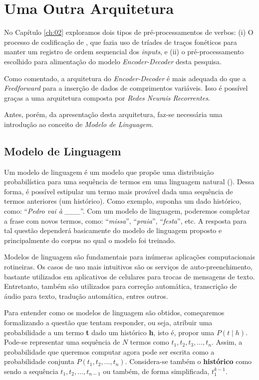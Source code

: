 \section{Uma Outra Arquitetura}
\label{sec:arqFDD}

No Capítulo \ref{ch:02} exploramos dois tipos de pré-processamentos de verbos: (i) O processo de codificação de \cite{rumelhart:1986}, que fazia uso de tríades de traços fonéticos para manter um registro de ordem sequencial dos \textit{inputs}, e (ii) o pré-processamento escolhido para alimentação do modelo \textit{Encoder-Decoder} desta pesquisa.

Como comentado, a arquitetura do \textit{Encoder-Decoder} é mais adequada do que a \textit{Feedforward} para a inserção de dados de comprimentos variáveis. Isso é possível graças a uma arquitetura composta por \textit{Redes Neurais Recorrentes}.

Antes, porém, da apresentação desta arquitetura, faz-se necessária uma introdução ao conceito de \textit{Modelo de Linguagem}.

\subsection{Modelo de Linguagem}

Um modelo de linguagem é um modelo que propõe uma distribuição probabilística para uma sequência de termos em uma linguagem natural (\cite{Manning:1999}).
Dessa forma, é possível estipular um termo mais provável dada uma sequência de termos anteriores (um histórico). Como exemplo, suponha um dado histórico, como: “\textit{Pedro vai à \_\_\_}”. Com um modelo de linguagem, poderemos completar a frase com novos termos, como: “\textit{missa}”, “\textit{praia}”, “\textit{festa}”, etc. A resposta para tal questão dependerá basicamente do modelo de linguagem proposto e principalmente do corpus no qual o modelo foi treinado. 

Modelos de linguagem são fundamentais para inúmeras aplicações computacionais rotineiras. Os casos de uso mais intuitivos são os serviços de auto-preenchimento, bastante utilizados em aplicativos de celulares para trocas de mensagens de texto. Entretanto, também são utilizados para correção automática, transcrição de áudio para texto,  tradução automática, entres outros.  

Para entender como os modelos de linguagem são obtidos, começaremos formalizando a questão que tentam responder, ou seja, atribuir uma probabilidade a um termo \textbf{t} dado um histórico \textbf{h}, isto é, propor uma $P(t \mid h)$. Pode-se representar uma sequência de $N$ termos como $t_1, t_2, t_3, ..., t_n$. Assim, a probabilidade que queremos computar agora pode ser escrita como a probabilidade conjunta $P(t_1, t_2, ..., t_n)$. Considera-se também o \textbf{histórico} como sendo a sequência $t_1, t_2, ..., t_{n-1}$ ou também, de forma simplificada, $t_{1}^{k-1}$. 

